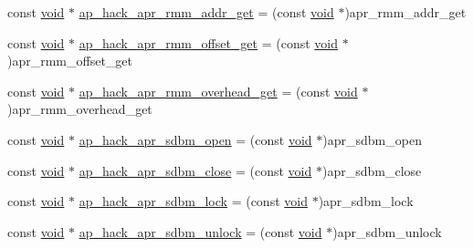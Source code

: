 \begin{DoxyCompactItemize}
\item 
const \hyperlink{group__MOD__ISAPI_gacd6cdbf73df3d9eed42fa493d9b621a6}{void} $\ast$ \hyperlink{srclib_2apr-util_2exports_8c_a16840c5b2215361e4412f68bef8274d8}{ap\+\_\+hack\+\_\+apr\+\_\+rmm\+\_\+addr\+\_\+get} = (const \hyperlink{group__MOD__ISAPI_gacd6cdbf73df3d9eed42fa493d9b621a6}{void} $\ast$)apr\+\_\+rmm\+\_\+addr\+\_\+get
\item 
const \hyperlink{group__MOD__ISAPI_gacd6cdbf73df3d9eed42fa493d9b621a6}{void} $\ast$ \hyperlink{srclib_2apr-util_2exports_8c_a2d790a5af00d000c7a8e1ee00e35509f}{ap\+\_\+hack\+\_\+apr\+\_\+rmm\+\_\+offset\+\_\+get} = (const \hyperlink{group__MOD__ISAPI_gacd6cdbf73df3d9eed42fa493d9b621a6}{void} $\ast$)apr\+\_\+rmm\+\_\+offset\+\_\+get
\item 
const \hyperlink{group__MOD__ISAPI_gacd6cdbf73df3d9eed42fa493d9b621a6}{void} $\ast$ \hyperlink{srclib_2apr-util_2exports_8c_ac882bd75acc8338bd64f1b3fc0f5c66c}{ap\+\_\+hack\+\_\+apr\+\_\+rmm\+\_\+overhead\+\_\+get} = (const \hyperlink{group__MOD__ISAPI_gacd6cdbf73df3d9eed42fa493d9b621a6}{void} $\ast$)apr\+\_\+rmm\+\_\+overhead\+\_\+get
\item 
const \hyperlink{group__MOD__ISAPI_gacd6cdbf73df3d9eed42fa493d9b621a6}{void} $\ast$ \hyperlink{srclib_2apr-util_2exports_8c_a8e9c34249fb8ea2c0ce459ee4d8af8c1}{ap\+\_\+hack\+\_\+apr\+\_\+sdbm\+\_\+open} = (const \hyperlink{group__MOD__ISAPI_gacd6cdbf73df3d9eed42fa493d9b621a6}{void} $\ast$)apr\+\_\+sdbm\+\_\+open
\item 
const \hyperlink{group__MOD__ISAPI_gacd6cdbf73df3d9eed42fa493d9b621a6}{void} $\ast$ \hyperlink{srclib_2apr-util_2exports_8c_a490a66bd5f43a6dff8d88627ddb0b111}{ap\+\_\+hack\+\_\+apr\+\_\+sdbm\+\_\+close} = (const \hyperlink{group__MOD__ISAPI_gacd6cdbf73df3d9eed42fa493d9b621a6}{void} $\ast$)apr\+\_\+sdbm\+\_\+close
\item 
const \hyperlink{group__MOD__ISAPI_gacd6cdbf73df3d9eed42fa493d9b621a6}{void} $\ast$ \hyperlink{srclib_2apr-util_2exports_8c_a8921f4dcb43dae893eab30ec7cc94f90}{ap\+\_\+hack\+\_\+apr\+\_\+sdbm\+\_\+lock} = (const \hyperlink{group__MOD__ISAPI_gacd6cdbf73df3d9eed42fa493d9b621a6}{void} $\ast$)apr\+\_\+sdbm\+\_\+lock
\item 
const \hyperlink{group__MOD__ISAPI_gacd6cdbf73df3d9eed42fa493d9b621a6}{void} $\ast$ \hyperlink{srclib_2apr-util_2exports_8c_af7ad3962a038ef6b88196be484c44307}{ap\+\_\+hack\+\_\+apr\+\_\+sdbm\+\_\+unlock} = (const \hyperlink{group__MOD__ISAPI_gacd6cdbf73df3d9eed42fa493d9b621a6}{void} $\ast$)apr\+\_\+sdbm\+\_\+unlock
\item 

\end{DoxyCompactItemize}
